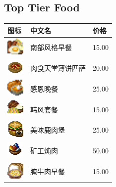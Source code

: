 \documentclass[UTF8]{ctexart}
\begin{document}
\subsection{Top Tier Food}
\begin{longtable}[]{|p{1cm}|p{8cm}|p{1.5cm}|}
\toprule
图标 & 中文名 & 价格\\
\midrule
	\includegraphics{.workspace/icons/harvestcraft/harvestcraft__southernstylebreakfastitem__0.png} & 南部风格早餐 &15.00\\
	\hline
	\includegraphics{.workspace/icons/harvestcraft/harvestcraft__meatfeastpizzaitem__0.png} & 肉食天堂薄饼匹萨 &20.00\\
	\hline
	\includegraphics{.workspace/icons/harvestcraft/harvestcraft__thankfuldinneritem__0.png} & 感恩晚餐 &25.00\\
	\hline
	\includegraphics{.workspace/icons/harvestcraft/harvestcraft__koreandinneritem__0.png} & 韩风套餐 &15.00\\
	\hline
	\includegraphics{.workspace/icons/harvestcraft/harvestcraft__gourmetvenisonburgeritem__0.png} & 美味鹿肉堡 &25.00\\
	\hline
	\includegraphics{.workspace/icons/harvestcraft/harvestcraft__minerstewitem__0.png} & 矿工炖肉 &50.00\\
	\hline
	\includegraphics{.workspace/icons/harvestcraft/harvestcraft__cornedbeefbreakfastitem__0.png} & 腌牛肉早餐 &15.00\\
	\hline

\end{longtable}
\end{document}
